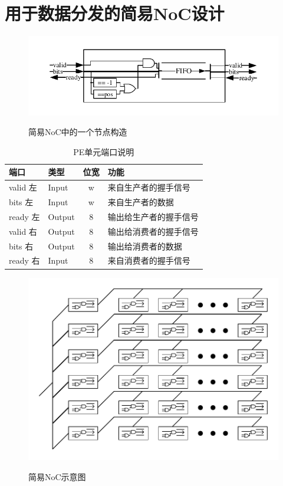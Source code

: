 \section{用于数据分发的简易NoC设计}
\begin{figure}[h]
    \centering
    \includegraphics{../pdf/node.pdf}\\
    \caption{简易NoC中的一个节点构造}
\end{figure}
\begin{table}[h] %
    \centering
    \caption{PE单元端口说明} %
    \begin{tabular}{l|l|c|l} %
    \hline  
    \hline  
    端口 & 类型 & 位宽 & 功能 \\ %
    \hline %
    valid 左 & Input & w & 来自生产者的握手信号 \\
    \hline  
    bits 左 & Input & w & 来自生产者的数据 \\
    \hline  
    ready 左 & Output & 8 & 输出给生产者的握手信号 \\
    \hline  
    valid 右 & Output & 8 & 输出给消费者的握手信号 \\
    \hline  
    bits 右 & Output & 8 & 输出给消费者的数据 \\
    \hline  
    ready 右 & Input & 8 & 来自消费者的握手信号 \\
    \hline  
    \hline  
    \end{tabular}  
\end{table}  
\begin{figure}[h]
    \centering
    \includegraphics{../pdf/noc.pdf}\\
    \caption{简易NoC示意图}
\end{figure}
